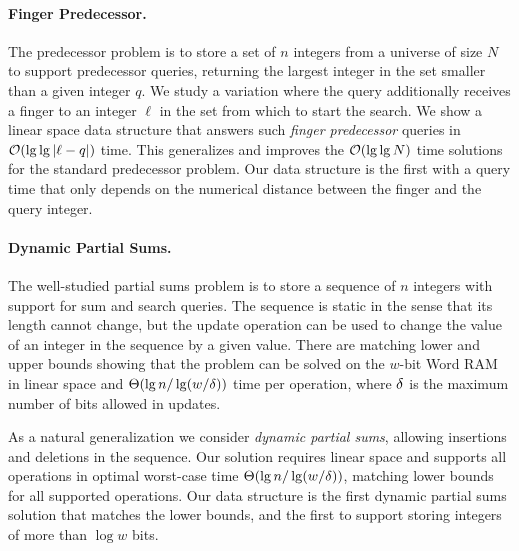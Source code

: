 \paragraph{Finger Predecessor.}
The predecessor problem is to store a set of $n$ integers from a universe of size $N$ to support predecessor queries, returning the largest integer in the set smaller than a given integer $q$. We study a variation where the query additionally receives a finger to an integer $\ell$ in the set from which to start the search. 
We show a linear space data structure that answers such \emph{finger predecessor} queries in $\mathcal{O}(\lg \lg |\ell-q|)$ time. This generalizes and improves the $\mathcal{O}(\lg \lg N)$ time solutions for the standard predecessor problem. Our data structure is the first with a query time that only depends on the numerical distance between the finger and the query integer.


\paragraph{Dynamic Partial Sums.}
The well-studied partial sums problem is to store a sequence of $n$ integers with support for sum and search queries. The sequence is static in the sense that its length cannot change, but the update operation can be used to change the value of an integer in the sequence by a given value. There are matching lower and upper bounds showing that the problem can be solved on the $w$-bit Word RAM in linear space and $\Theta(\lg n / \lg (w/\delta))$ time per operation, where $\delta$ is the maximum number of bits allowed in updates. 

As a natural generalization we consider \emph{dynamic partial sums}, allowing insertions and deletions in the sequence. Our solution requires linear space and supports all operations in optimal worst-case time $\Theta(\lg n / \lg (w/\delta))$, matching lower bounds for all supported operations. Our data structure is the first dynamic partial sums solution that matches the lower bounds, and the first to support storing integers of more than $\log w$ bits.


